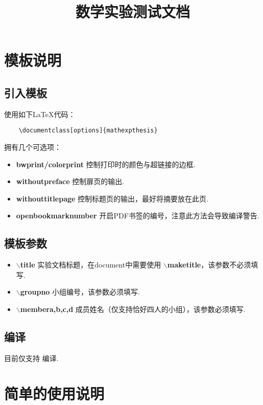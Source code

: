 \documentclass[bwprint, withouttitlepage]{mathexpthesis}
\title{数学实验测试文档}
\begin{document}
\maketitle
\tableofcontents
\newpage
\section{模板说明}
\subsection{引入模板}
使用如下\LaTeX 代码：
\begin{verbatim}
    \documentclass[options]{mathexpthesis}
\end{verbatim}

拥有几个可选项：
\begin{itemize}[itemindent=2em]
    \item \textbf{bwprint/colorprint} 控制打印时的颜色与超链接的边框.
    \item \textbf{withoutpreface} 控制扉页的输出.
    \item \textbf{withouttitlepage} 控制标题页的输出，最好将摘要放在此页.
    \item \textbf{openbookmarknumber} 开启PDF书签的编号，注意此方法会导致编译警告.
\end{itemize}

\subsection{模板参数}
\begin{itemize}[itemindent=2em]
    \item \textbf{$\backslash$title} 实验文档标题，在document中需要使用 \textbf{$\backslash$maketitle}，该参数不必须填写.
    \item \textbf{$\backslash$groupno} 小组编号，该参数必须填写.
    \item \textbf{$\backslash$membera,b,c,d} 成员姓名（仅支持恰好四人的小组），该参数必须填写.
\end{itemize}

\subsection{编译}
目前仅支持 编译.

\section{简单的使用说明}
\end{document}

